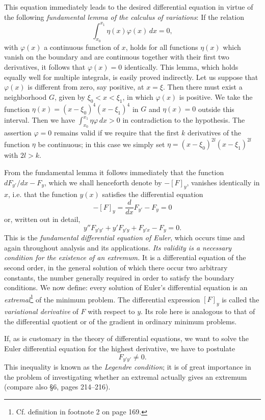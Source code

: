 This equation immediately leads to the desired differential equation in virtue of the following \emph{fundamental lemma of the calculus of variations}: If the relation
\[
\int_{x_0}^{x_1}\eta(x)\varphi(x)\,dx=0,
\]
with $\varphi(x)$ a continuous function of $x$, holds for all functions $\eta(x)$ which vanish on the boundary and are continuous together with their first two derivatives, it follows that $\varphi(x)=0$ identically. This lemma, which holds equally well for multiple integrals, is easily proved indirectly. Let us suppose that $\varphi(x)$ is different from zero, say positive, at $x=\xi$. Then there must exist a neighborhood $G$, given by $\xi_0<x<\xi_1$, in which $\varphi(x)$ is positive. We take the function $\eta(x)=(x-\xi_0)^4(x-\xi_1)^4$ in $G$ and $\eta(x)=0$ outside this interval. Then we have $\int_{x_0}^{x_1}\eta\varphi\,dx>0$ in contradiction to the hypothesis. The assertion $\varphi=0$ remains valid if we require that the first $k$ derivatives of the function $\eta$ be continuous; in this case we simply set $\eta=(x-\xi_0)^{2l}(x-\xi_1)^{2l}$ with $2l>k$.

From the fundamental lemma it follows immediately that the function $dF_{y'}/dx-F_y$, which we shall henceforth denote by $-[F]_y$, vanishes identically in $x$, i.e. that the function $y(x)$ satisfies the differential equation
\begin{equation}\tag{14}
-[F]_y=\frac{d}{dx}F_{y'}-F_y=0
\end{equation}
or, written out in detail,
\begin{equation}\tag{14'}
y''F_{y'y'}+y'F_{y'y}+F_{y'x}-F_y=0.
\end{equation}
This is the \emph{fundamental differential equation of Euler}, which occurs time and again throughout analysis and its applications. \emph{Its validity is a necessary condition for the existence of an extremum.} It is a differential equation of the second order, in the general solution of which there occur two arbitrary constants, the number generally required in order to satisfy the boundary conditions. We now define: every solution of Euler's differential equation is an \emph{extremal}\footnote{Cf. definition in footnote 2 on page 169.} of the minimum problem. The differential expression $[F]_y$ is called the \emph{variational derivative} of $F$ with respect to $y$. Its role here is analogous to that of the differential quotient or of the gradient in ordinary minimum problems.

If, as is customary in the theory of differential equations, we want to solve the Euler differential equation for the highest derivative, we have to postulate
\[
F_{y'y'}\ne0.
\]
This inequality is known as the \emph{Legendre condition}; it is of great importance in the problem of investigating whether an extremal actually gives an extremum (compare also \S6, pages 214--216).

